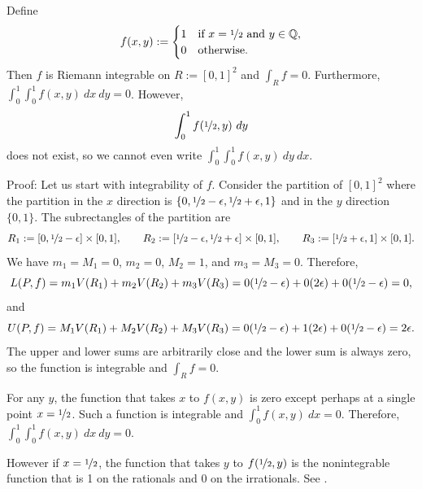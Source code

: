 \begin{example}
Define 
\begin{equation*}
f(x,y) := 
\begin{cases}
1 & \text{if } x=\nicefrac{1}{2} \text{ and } y \in {\mathbb{Q}}, \\
0 & \text{otherwise.}
\end{cases}
\end{equation*}
Then $f$ is Riemann integrable on $R := [0,1]^2$ and $\int_R f = 0$.
Furthermore, $\int_0^1 \int_0^1 f(x,y) ~ dx ~ dy = 0$.
However,
\begin{equation*}
\int_0^1 f(\nicefrac{1}{2},y) ~ dy
\end{equation*}
does not exist, so we cannot even write $\int_0^1 \int_0^1 f(x,y) ~ dy ~ dx$.

Proof:
Let us start with integrability of $f$.  Consider the partition
of $[0,1]^2$ where the partition in the $x$ direction is
$\{ 0, \nicefrac{1}{2}-\epsilon,
\nicefrac{1}{2}+\epsilon,1\}$ and in the $y$ direction $\{ 0, 1 \}$.
The subrectangles of the partition are
\begin{equation*}
R_1 := [0,
\nicefrac{1}{2}-\epsilon] \times [0,1],
\qquad
R_2 := [\nicefrac{1}{2}-\epsilon,
\nicefrac{1}{2}+\epsilon] \times [0,1],
\qquad
R_3 := [\nicefrac{1}{2}+\epsilon,1] \times [0,1] .
\end{equation*}
We have $m_1 = M_1 = 0$, $m_2 =0$, $M_2 = 1$, and $m_3 = M_3 = 0$.
Therefore,
\begin{equation*}
L(P,f) = 
m_1 V(R_1)
+
m_2 V(R_2)
+
m_3 V(R_3)
=
0 (\nicefrac{1}{2}-\epsilon)
+
0 (2\epsilon)
+
0 (\nicefrac{1}{2}-\epsilon) = 0 ,
\end{equation*}
and
\begin{equation*}
U(P,f) = 
M_1 V(R_1)
+
M_2 V(R_2)
+
M_3 V(R_3)
=
0 (\nicefrac{1}{2}-\epsilon)
+
1 (2\epsilon)
+
0 (\nicefrac{1}{2}-\epsilon) = 2 \epsilon .
\end{equation*}
The upper and lower sums are arbitrarily close and the lower sum is always
zero, so the function is integrable and $\int_R f = 0$.

For any $y$, the function that takes $x$ to $f(x,y)$ is zero except
perhaps at a single point $x=\nicefrac{1}{2}$.  Such a
function is integrable and $\int_0^1 f(x,y) ~ dx = 0$.  Therefore,
$\int_0^1 \int_0^1 f(x,y) ~ dx ~ dy = 0$.

However if $x=\nicefrac{1}{2}$, the function that takes $y$ to
$f(\nicefrac{1}{2},y)$ is the nonintegrable function that is
1 on the rationals and 0 on the irrationals.
See .
\end{example}

